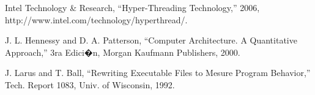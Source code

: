 \documentclass[a4paper,10pt]{article}
\begin{document}
\begin{thebibliography}{99}

 Intel Technology \& Research, ``Hyper-Threading Technology,'' 2006, http://www.intel.com/technology/hyperthread/.

 J. L. Hennessy and D. A. Patterson, ``Computer Architecture. A Quantitative
Approach,'' 3ra Edici�n, Morgan Kaufmann Publishers, 2000.

 J. Larus and T. Ball, ``Rewriting Executable Files to Mesure Program Behavior,'' Tech. Report 1083, Univ. of Wisconsin, 1992.

\end{thebibliography}
\end{document}
